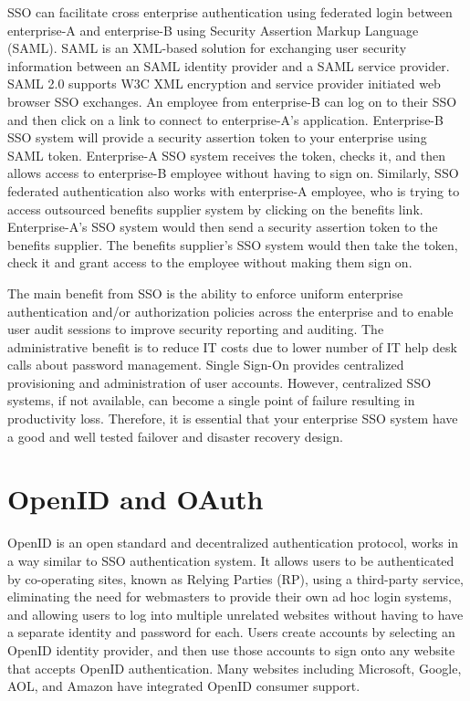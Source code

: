 \begin{multicols}{2}
SSO can facilitate cross enterprise authentication using federated login between enterprise-A and enterprise-B using Security Assertion Markup Language (SAML). SAML is an XML-based solution for exchanging user security information between an SAML identity provider and a SAML service provider. SAML 2.0 supports W3C XML encryption and service provider initiated web browser SSO exchanges. An employee from enterprise-B can log on to their SSO and then click on a link to connect to enterprise-A's application. Enterprise-B SSO system will provide a security assertion token to your enterprise using SAML token. Enterprise-A SSO system receives the token, checks it, and then allows access to enterprise-B employee without having to sign on. Similarly, SSO federated authentication also works with enterprise-A employee, who is trying to access outsourced benefits supplier system by clicking on the benefits link. Enterprise-A's SSO system would then send a security assertion token to the benefits supplier. The benefits supplier's SSO system would then take the token, check it and grant access to the employee without making them sign on.

The main benefit from SSO is the ability to enforce uniform enterprise authentication and/or authorization policies across the enterprise and to enable user audit sessions to improve security reporting and auditing. The administrative benefit is to reduce IT costs due to lower number of IT help desk calls about password management. Single Sign-On provides centralized provisioning and administration of user accounts. However, centralized SSO systems, if not available, can become a single point of failure resulting in productivity loss. Therefore, it is essential that your enterprise SSO system have a good and well tested failover and disaster recovery design.

\section*{OpenID and OAuth}

OpenID is an open standard and decentralized authentication protocol, works in a way similar to SSO authentication system. It allows users to be authenticated by co-operating sites, known as Relying Parties (RP), using a third-party service, eliminating the need for webmasters to provide their own ad hoc login systems, and allowing users to log into multiple unrelated websites without having to have a separate identity and password for each. Users create accounts by selecting an OpenID identity provider, and then use those accounts to sign onto any website that accepts OpenID authentication. Many websites including Microsoft, Google, AOL, and Amazon have integrated OpenID consumer support.


\end{multicols}
